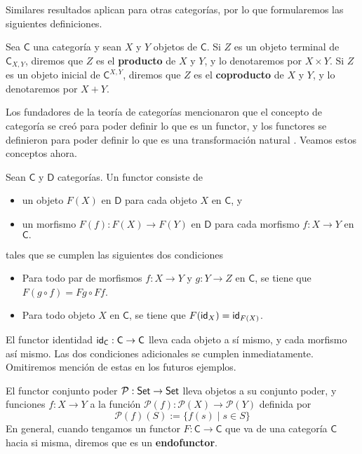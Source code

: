 \documentclass[../main.tex]{subfiles}
\begin{document}
Similares resultados aplican para otras categor\'ias, por lo que formularemos las siguientes definiciones.

\begin{definitionap}
    Sea $\mathsf{C}$ una categor\'ia y sean $X$ y $Y$ objetos de $\mathsf{C}$.
    Si $Z$ es un objeto terminal de $\mathsf{C}_{X,Y}$, diremos que $Z$ es el \textbf{producto} de $X$ y $Y$, y lo denotaremos por $X \times Y$.
    Si $Z$ es un objeto inicial de $\mathsf{C}^{X,Y}$, diremos que $Z$ es el \textbf{coproducto} de $X$ y $Y$, y lo denotaremos por $X + Y$.
\end{definitionap}

Los fundadores de la teor\'ia de categor\'ias mencionaron que el concepto de categor\'ia se cre\'o para poder definir lo que es un functor, y los functores se definieron para poder definir lo que es una transformaci\'on natural \cite{mac_lane_categories_2010}. Veamos estos conceptos ahora.

\begin{definitionap}
    Sean $\mathsf{C}$ y $\mathsf{D}$ categor\'ias. Un functor consiste de
    \begin{itemize}
        \item un objeto $F(X)$ en $\mathsf{D}$ para cada objeto $X$ en $\mathsf{C}$, y
        \item un morfismo $F(f):F(X) \to F(Y)$ en $\mathsf{D}$ para cada morfismo $f:X \to Y$ en $\mathsf{C}.$
    \end{itemize}
    tales que se cumplen las siguientes dos condiciones
    \begin{itemize}
        \item Para todo par de morfismos $f: X \to Y$ y $g: Y \to Z$ en $\mathsf{C}$, se tiene que $F(g \circ f) = F g \circ F f$.
        \item Para todo objeto $X$ en $\mathsf{C}$, se tiene que $F(\idfunc[X])=\idfunc[F(X)]$.
    \end{itemize}
\end{definitionap}

\begin{exampleap}
    El functor identidad $\idfunc[\mathsf{C}]:\mathsf{C} \to\mathsf{C}$ lleva cada objeto a s\'i mismo, y cada morfismo as\'i mismo. Las dos condiciones adicionales se cumplen inmediatamente.
    Omitiremos menci\'on de estas en los futuros ejemplos.
\end{exampleap}

\begin{exampleap}
    El functor conjunto poder $\mathcal{P}:\set \to \set$ lleva objetos a su conjunto poder, y funciones $f:X \to Y$ a la funci\'on $\mathcal{P}(f):\mathcal{P}(X) \to \mathcal{P}(Y)$ definida por
    \[ \mathcal{P}(f)(S) := \{ f(s) \mid s \in S \} \]
    En general, cuando tengamos un functor $F: \mathsf{C} \to \mathsf{C}$ que va de una categor\'ia $\mathsf{C}$ hacia si misma, diremos que es un \textbf{endofunctor}.
\end{exampleap}
\end{document}
